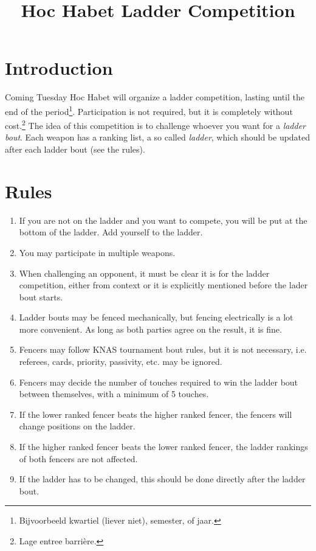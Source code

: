 \documentclass{article}
\title{Hoc Habet Ladder Competition}
\author{}
\date{}
\begin{document}
\maketitle
\section{Introduction}
Coming Tuesday Hoc Habet will organize a ladder competition, lasting until the end of the period\footnote{Bijvoorbeeld kwartiel (liever niet), semester, of jaar.}. Participation is not required, but it is completely without cost.\footnote{Lage entree barrière.} The idea of this competition is to challenge whoever you want for a \emph{ladder bout}. Each weapon has a ranking list, a so called \emph{ladder}, which should be updated after each ladder bout (see the rules). 

\section{Rules}
\begin{enumerate} 
    \item If you are not on the ladder and you want to compete, you will be put at the bottom of the ladder. Add yourself to the ladder.
    \item You may participate in multiple weapons.
    \item When challenging an opponent, it must be clear it is for the ladder competition, either from context or it is explicitly mentioned before the lader bout starts.
    \item Ladder bouts may be fenced mechanically, but fencing electrically is a lot more convenient. As long as both parties agree on the result, it is fine.
    \item Fencers may follow KNAS tournament bout rules, but it is not necessary, i.e. referees, cards, priority, passivity, etc. may be ignored.
    \item Fencers may decide the number of touches required to win the ladder bout between themselves, with a minimum of 5 touches.
    \item If the lower ranked fencer beats the higher ranked fencer, the fencers will change positions on the ladder.
    \item If the higher ranked fencer beats the lower ranked fencer, the ladder rankings of both fencers are not affected.
    \item If the ladder has to be changed, this should be done directly after the ladder bout.
\end{enumerate}
\newpage
\end{document}
